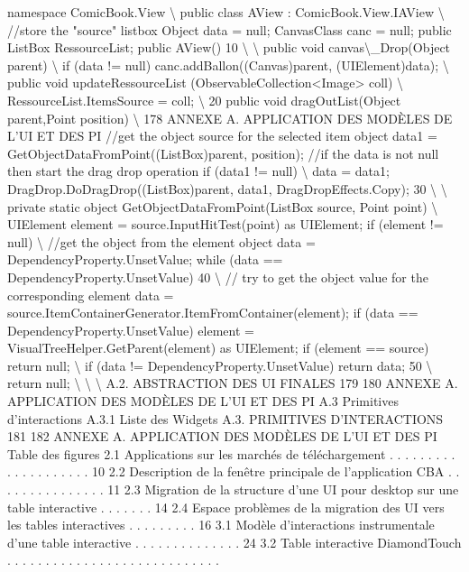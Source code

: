 \documentclass{article}
\begin{document}
namespace ComicBook.View
\textbackslash{}{
public class AView : ComicBook.View.IAView
\textbackslash{}{
//store the "source" listbox
Object data = null;
CanvasClass canc = null;
public ListBox RessourceList;
public AView()
10
\textbackslash{}{ \textbackslash{}}
public void canvas\textbackslash{}_Drop(Object parent)
\textbackslash{}{
if (data != null)
canc.addBallon((Canvas)parent, (UIElement)data);
\textbackslash{}}
public void updateRessourceList (ObservableCollection<Image> coll)
\textbackslash{}{
RessourceList.ItemsSource = coll;
\textbackslash{}}
20
public void dragOutList(Object parent,Point position)
\textbackslash{}{
178
ANNEXE A. APPLICATION DES MODÈLES DE L’UI ET DES PI
//get the object source for the selected item
object data1 = GetObjectDataFromPoint((ListBox)parent, position);
//if the data is not null then start the drag drop operation
if (data1 != null)
\textbackslash{}{
data = data1;
DragDrop.DoDragDrop((ListBox)parent, data1, DragDropEffects.Copy);
30
\textbackslash{}}
\textbackslash{}}
private static object GetObjectDataFromPoint(ListBox source, Point point)
\textbackslash{}{
UIElement element = source.InputHitTest(point) as UIElement;
if (element != null)
\textbackslash{}{
//get the object from the element
object data = DependencyProperty.UnsetValue;
while (data == DependencyProperty.UnsetValue)
40
\textbackslash{}{
// try to get the object value for the corresponding element
data = source.ItemContainerGenerator.ItemFromContainer(element);
if (data == DependencyProperty.UnsetValue)
element = VisualTreeHelper.GetParent(element) as UIElement;
if (element == source)
return null;
\textbackslash{}}
if (data != DependencyProperty.UnsetValue)
return data;
50
\textbackslash{}}
return null;
\textbackslash{}}
\textbackslash{}}
\textbackslash{}}
A.2. ABSTRACTION DES UI FINALES
179
180
ANNEXE A. APPLICATION DES MODÈLES DE L’UI ET DES PI
A.3
Primitives d’interactions
A.3.1
Liste des Widgets
A.3. PRIMITIVES D’INTERACTIONS
181
182
ANNEXE A. APPLICATION DES MODÈLES DE L’UI ET DES PI
Table des ﬁgures
2.1
Applications sur les march\'{e}s de t\'{e}l\'{e}chargement . . . . . . . . . . . . . . . . . . . .
10
2.2
Description de la fen\^{e}tre principale de l’application CBA . . . . . . . . . . . . . . .
11
2.3
Migration de la structure d’une UI pour desktop sur une table interactive . . . . . . .
14
2.4
Espace probl\`{e}mes de la migration des UI vers les tables interactives
. . . . . . . . .
16
3.1
Mod\`{e}le d’interactions instrumentale d’une table interactive . . . . . . . . . . . . . .
24
3.2
Table interactive DiamondTouch . . . . . . . . . . . . . . . . . . . . . . . . . . . .
\end{document}
